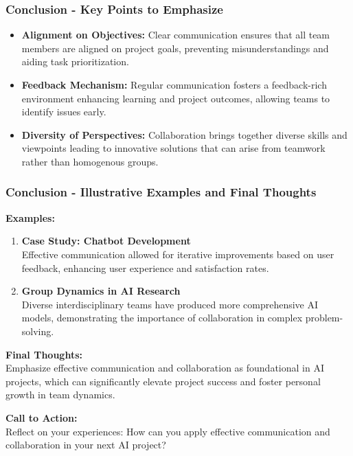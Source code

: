 \documentclass{beamer}
\begin{document}
\begin{frame}[fragile]
    \frametitle{Conclusion - Key Points to Emphasize}

    \begin{itemize}
        \item \textbf{Alignment on Objectives:} Clear communication ensures that all team members are aligned on project goals, preventing misunderstandings and aiding task prioritization.
        \item \textbf{Feedback Mechanism:} Regular communication fosters a feedback-rich environment enhancing learning and project outcomes, allowing teams to identify issues early.
        \item \textbf{Diversity of Perspectives:} Collaboration brings together diverse skills and viewpoints leading to innovative solutions that can arise from teamwork rather than homogenous groups.
    \end{itemize}
\end{frame}

\begin{frame}[fragile]
    \frametitle{Conclusion - Illustrative Examples and Final Thoughts}

    \textbf{Examples:}
    \begin{enumerate}
        \item \textbf{Case Study: Chatbot Development} \\
        Effective communication allowed for iterative improvements based on user feedback, enhancing user experience and satisfaction rates.
        \item \textbf{Group Dynamics in AI Research} \\
        Diverse interdisciplinary teams have produced more comprehensive AI models, demonstrating the importance of collaboration in complex problem-solving.
    \end{enumerate}

    \textbf{Final Thoughts:} \\
    Emphasize effective communication and collaboration as foundational in AI projects, which can significantly elevate project success and foster personal growth in team dynamics.
    
    \textbf{Call to Action:} \\
    Reflect on your experiences: How can you apply effective communication and collaboration in your next AI project?
\end{frame}
\end{document}
